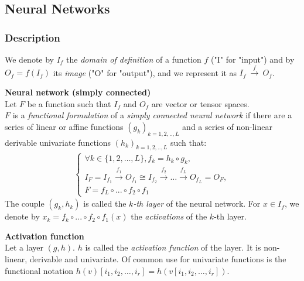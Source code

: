 \subsection{Neural Networks}

\subsubsection{Description}

We denote by $I_f$ the \textit{domain of definition} of a function $f$ ("I" for "input") and by $O_f = f(I_f)$ its \textit{image} ("O" for "output"), and we represent it as $I_f~\xrightarrow{f}~O_f$.

\begin{definition}\textbf{Neural network (simply connected)}\\
Let $F$ be a function such that $I_f$ and $O_f$ are vector or tensor spaces.\\
$F$ is a \emph{functional formulation} of a \emph{simply connected neural network} if there are a series of linear or affine functions $(g_k)_{k=1,2,..,L}$ and a series of non-linear derivable univariate functions $(h_k)_{k=1,2,..,L}$ such that:
\begin{gather*}
\left\{
  \begin{array}{l}
    \forall k \in \{1, 2, \ldots, L\}, f_k = h_k \circ g_k, \\
    I_F = I_{f_1} \xrightarrow{f_1} O_{f_1} \cong I_{f_2} \xrightarrow{f_2} \dots \xrightarrow{f_L} O_{f_L} = O_F, \\
    F = f_{L} \circ ... \circ f_{2} \circ f_1
  \end{array}
\right.
\end{gather*}
The couple $(g_k, h_k)$ is called the \emph{$k$-th layer} of the neural network.
For $x \in I_f$, we denote by $x_k = f_k \circ ... \circ f_{2} \circ f_1 (x)$ the \emph{activations} of the $k$-th layer.
\label{def:nn}
\end{definition}


\begin{definition}\textbf{Activation function}\\
Let a layer $(g,h)$. $h$ is called the \emph{activation function} of the layer. It is non-linear, derivable and univariate. Of common use for univariate functions is the functional notation $h(v)[i_1, i_2, \ldots, i_r] = h(v[i_1, i_2, \ldots, i_r])$.
\end{definition}


